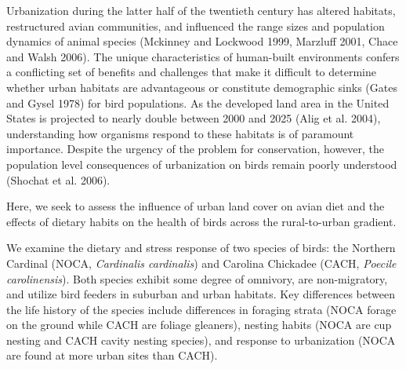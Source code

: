 \documentclass[12pt]{article}
\date{}
\begin{document}
\maketitle \vspace{-2cm}


\doublespace
{}\par
Urbanization during the latter half of the twentieth century has altered habitats, restructured avian communities, and influenced the range sizes and population dynamics of animal species (Mckinney and Lockwood 1999, Marzluff 2001, Chace and Walsh 2006). The unique characteristics of human-built environments confers a conflicting set of benefits and challenges that make it difficult to determine whether urban habitats are advantageous or constitute demographic sinks (Gates and Gysel 1978) for bird populations. As the developed land area in the United States is projected to nearly double between 2000 and 2025 (Alig et al. 2004), understanding how organisms respond to these habitats is of paramount importance. Despite the urgency of the problem for conservation, however, the population level consequences of urbanization on birds remain poorly understood (Shochat et al. 2006). \par


\par
Here, we seek to assess the influence of urban land cover on avian diet and the effects of dietary habits on the health of birds across the rural-to-urban gradient.


\par
We examine the dietary and stress response of two species of birds: the Northern Cardinal (NOCA, \textit{Cardinalis cardinalis}) and Carolina Chickadee (CACH, \textit{Poecile carolinensis}). Both species exhibit some degree of omnivory, are non-migratory, and utilize bird feeders in suburban and urban habitats. Key differences between the life history of the species include differences in foraging strata (NOCA forage on the ground while CACH are foliage gleaners), nesting habits (NOCA are cup nesting and CACH cavity nesting species), and response to urbanization (NOCA are found at more urban sites than CACH).

\end{document}
